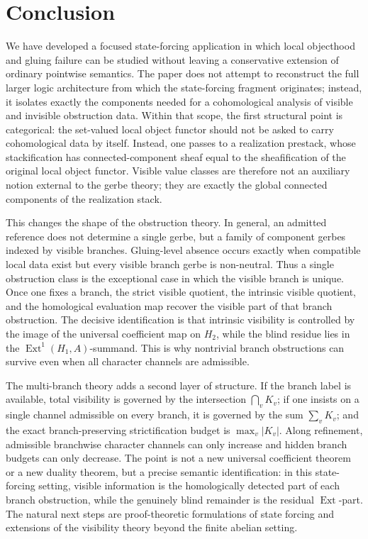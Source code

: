 \section{Conclusion}\label{sec:conclusion}

We have developed a focused state-forcing application in which local objecthood and gluing failure can be studied without leaving a conservative extension of ordinary pointwise semantics. The paper does not attempt to reconstruct the full larger logic architecture from which the state-forcing fragment originates; instead, it isolates exactly the components needed for a cohomological analysis of visible and invisible obstruction data. Within that scope, the first structural point is categorical: the set-valued local object functor should not be asked to carry cohomological data by itself. Instead, one passes to a realization prestack, whose stackification has connected-component sheaf equal to the sheafification of the original local object functor. Visible value classes are therefore not an auxiliary notion external to the gerbe theory; they are exactly the global connected components of the realization stack.

This changes the shape of the obstruction theory. In general, an admitted reference does not determine a single gerbe, but a family of component gerbes indexed by visible branches. Gluing-level absence occurs exactly when compatible local data exist but every visible branch gerbe is non-neutral. Thus a single obstruction class is the exceptional case in which the visible branch is unique. Once one fixes a branch, the strict visible quotient, the intrinsic visible quotient, and the homological evaluation map recover the visible part of that branch obstruction. The decisive identification is that intrinsic visibility is controlled by the image of the universal coefficient map on $H_2$, while the blind residue lies in the $\operatorname{Ext}^1(H_1,A)$-summand. This is why nontrivial branch obstructions can survive even when all character channels are admissible.

The multi-branch theory adds a second layer of structure. If the branch label is available, total visibility is governed by the intersection $\bigcap_v K_v$; if one insists on a single channel admissible on every branch, it is governed by the sum $\sum_v K_v$; and the exact branch-preserving strictification budget is $\max_v |K_v|$. Along refinement, admissible branchwise character channels can only increase and hidden branch budgets can only decrease. The point is not a new universal coefficient theorem or a new duality theorem, but a precise semantic identification: in this state-forcing setting, visible information is the homologically detected part of each branch obstruction, while the genuinely blind remainder is the residual $\operatorname{Ext}$-part. The natural next steps are proof-theoretic formulations of state forcing and extensions of the visibility theory beyond the finite abelian setting.
